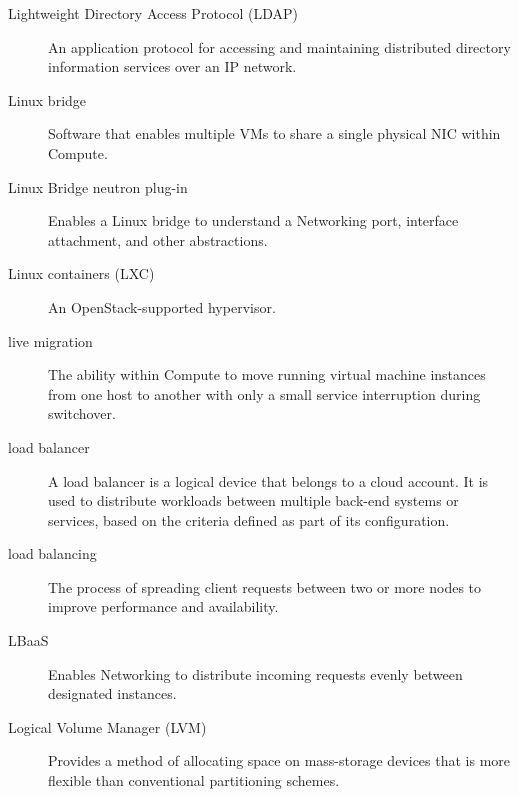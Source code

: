 \documentclass[letterpaper,10pt,english]{sphinxmanual}
\begin{document}
\begin{description}
\item[{Lightweight Directory Access Protocol (LDAP)}] \leavevmode{}\label{_source/glossary:term-lightweight-directory-access-protocol-ldap}
An application protocol for accessing and maintaining distributed
directory information services over an IP network.

\item[{Linux bridge}] \leavevmode{}\label{_source/glossary:term-linux-bridge}
Software that enables multiple VMs to share a single physical
NIC within Compute.

\item[{Linux Bridge neutron plug-in}] \leavevmode{}\label{_source/glossary:term-linux-bridge-neutron-plug-in}
Enables a Linux bridge to understand a Networking port,
interface attachment, and other abstractions.

\item[{Linux containers (LXC)}] \leavevmode{}\label{_source/glossary:term-linux-containers-lxc}
An OpenStack-supported hypervisor.

\item[{live migration}] \leavevmode{}\label{_source/glossary:term-live-migration}
The ability within Compute to move running virtual machine
instances from one host to another with only a small service
interruption during switchover.

\item[{load balancer}] \leavevmode{}\label{_source/glossary:term-load-balancer}
A load balancer is a logical device that belongs to a cloud
account. It is used to distribute workloads between multiple back-end
systems or services, based on the criteria defined as part of its
configuration.

\item[{load balancing}] \leavevmode{}\label{_source/glossary:term-load-balancing}
The process of spreading client requests between two or more
nodes to improve performance and availability.

\item[{LBaaS}] \leavevmode{}\label{_source/glossary:term-lbaas}
Enables Networking to distribute incoming requests evenly
between designated instances.

\item[{Logical Volume Manager (LVM)}] \leavevmode{}\label{_source/glossary:term-logical-volume-manager-lvm}
Provides a method of allocating space on mass-storage
devices that is more flexible than conventional partitioning
schemes.

\end{description}
\end{document}

